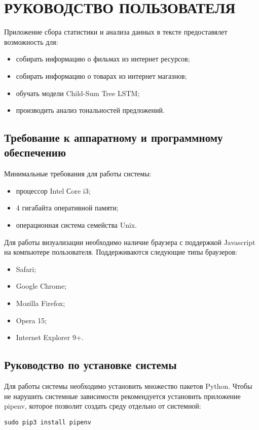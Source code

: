 \section{РУКОВОДСТВО ПОЛЬЗОВАТЕЛЯ}
Приложение сбора статистики и анализа данных в тексте предоставялет возможность для:
\begin{itemize}
\item собирать информацию о фильмах из интернет ресурсов;
\item собирать информацию о товарах из интернет магазнов;
\item обучать модели Child-Sum Tree LSTM\@;
\item производить анализ тональностей предложений.
\end{itemize}

\subsection{Требование к аппаратному и программному обеспечению}
Минимальные требования для работы системы:
\begin{itemize}
\item процессор Intel Сore i3;
\item 4 гигабайта оперативной памяти;
\item операционная система семейства Unix.
\end{itemize}

Для работы визуализации необходимо наличие браузера с поддержкой Javascript на компьютере пользователя. Поддерживаются следующие типы браузеров:
\begin{itemize}
\item Safari;
\item Google Chrome;
\item Mozilla Firefox;
\item Opera 15;
\item Internet Explorer 9+.
\end{itemize}

\subsection{Руководство по установке системы}
Для работы системы необходимо установить множество пакетов Python. Чтобы не нарушить системные зависимости рекомендуется установить приложение pipenv, которое позволит создать среду отдельно от системной:
\medskip
\begin{lstlisting}[style=Python]
  sudo pip3 install pipenv
\end{lstlisting}
\medskip

